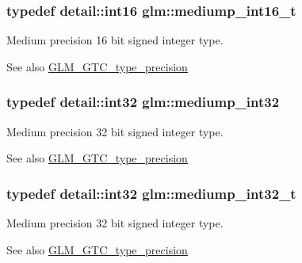 \subsubsection[{\texorpdfstring{mediump\+\_\+int16\+\_\+t}{mediump_int16_t}}]{\setlength{\rightskip}{0pt plus 5cm}typedef detail\+::int16 {\bf glm\+::mediump\+\_\+int16\+\_\+t}}\hypertarget{group__gtc__type__precision_ga478fab608cf43040013d719a3e03b194}{}\label{group__gtc__type__precision_ga478fab608cf43040013d719a3e03b194}
Medium precision 16 bit signed integer type. \begin{DoxySeeAlso}{See also}
\hyperlink{group__gtc__type__precision}{G\+L\+M\+\_\+\+G\+T\+C\+\_\+type\+\_\+precision} 
\end{DoxySeeAlso}
\subsubsection[{\texorpdfstring{mediump\+\_\+int32}{mediump_int32}}]{\setlength{\rightskip}{0pt plus 5cm}typedef detail\+::int32 {\bf glm\+::mediump\+\_\+int32}}\hypertarget{group__gtc__type__precision_ga0660a752402702f420f13c686a7fff29}{}\label{group__gtc__type__precision_ga0660a752402702f420f13c686a7fff29}
Medium precision 32 bit signed integer type. \begin{DoxySeeAlso}{See also}
\hyperlink{group__gtc__type__precision}{G\+L\+M\+\_\+\+G\+T\+C\+\_\+type\+\_\+precision} 
\end{DoxySeeAlso}
\subsubsection[{\texorpdfstring{mediump\+\_\+int32\+\_\+t}{mediump_int32_t}}]{\setlength{\rightskip}{0pt plus 5cm}typedef detail\+::int32 {\bf glm\+::mediump\+\_\+int32\+\_\+t}}\hypertarget{group__gtc__type__precision_gafd9b4bd9e4465aec63351b59100692c4}{}\label{group__gtc__type__precision_gafd9b4bd9e4465aec63351b59100692c4}
Medium precision 32 bit signed integer type. \begin{DoxySeeAlso}{See also}
\hyperlink{group__gtc__type__precision}{G\+L\+M\+\_\+\+G\+T\+C\+\_\+type\+\_\+precision} 
\end{DoxySeeAlso}
